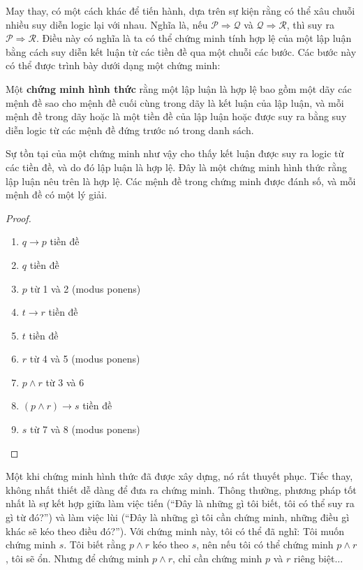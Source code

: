 May thay, có một cách khác để tiến hành, dựa trên sự kiện rằng có thể xâu chuỗi nhiều suy diễn logic lại với nhau. Nghĩa là, nếu $\mathcal{P} \Longrightarrow \mathcal{Q}$ và $\mathcal{Q} \Longrightarrow \mathcal{R}$, thì suy ra $\mathcal{P} \Longrightarrow \mathcal{R}$. Điều này có nghĩa là ta có thể chứng minh tính hợp lệ của một lập luận bằng cách suy diễn kết luận từ các tiền đề qua một chuỗi các bước. Các bước này có thể được trình bày dưới dạng một chứng minh:

\begin{definition}
Một \textbf{chứng minh hình thức} rằng một lập luận là hợp lệ bao gồm một dãy các mệnh đề sao cho mệnh đề cuối cùng trong dãy là kết luận của lập luận, và mỗi mệnh đề trong dãy hoặc là một tiền đề của lập luận hoặc được suy ra bằng suy diễn logic từ các mệnh đề đứng trước nó trong danh sách.
\end{definition}

Sự tồn tại của một chứng minh như vậy cho thấy kết luận được suy ra logic từ các tiền đề, và do đó lập luận là hợp lệ. Đây là một chứng minh hình thức rằng lập luận nêu trên là hợp lệ. Các mệnh đề trong chứng minh được đánh số, và mỗi mệnh đề có một lý giải.

\begin{proof}
\begin{enumerate}
\item $q \to p$ \hfill tiền đề
\item $q$ \hfill tiền đề
\item $p$ \hfill từ 1 và 2 (modus ponens)
\item $t \to r$ \hfill tiền đề
\item $t$ \hfill tiền đề
\item $r$ \hfill từ 4 và 5 (modus ponens)
\item $p \land r$ \hfill từ 3 và 6
\item $(p \land r) \to s$ \hfill tiền đề
\item $s$ \hfill từ 7 và 8 (modus ponens)
\end{enumerate}
\end{proof}

\begin{notebox}
Một khi chứng minh hình thức đã được xây dựng, nó rất thuyết phục. Tiếc thay, không nhất thiết dễ dàng để đưa ra chứng minh. Thông thường, phương pháp tốt nhất là sự kết hợp giữa làm việc tiến (``Đây là những gì tôi biết, tôi có thể suy ra gì từ đó?'') và làm việc lùi (``Đây là những gì tôi cần chứng minh, những điều gì khác sẽ kéo theo điều đó?''). Với chứng minh này, tôi có thể đã nghĩ: Tôi muốn chứng minh $s$. Tôi biết rằng $p \land r$ kéo theo $s$, nên nếu tôi có thể chứng minh $p \land r$, tôi sẽ ổn. Nhưng để chứng minh $p \land r$, chỉ cần chứng minh $p$ và $r$ riêng biệt...
\end{notebox}

